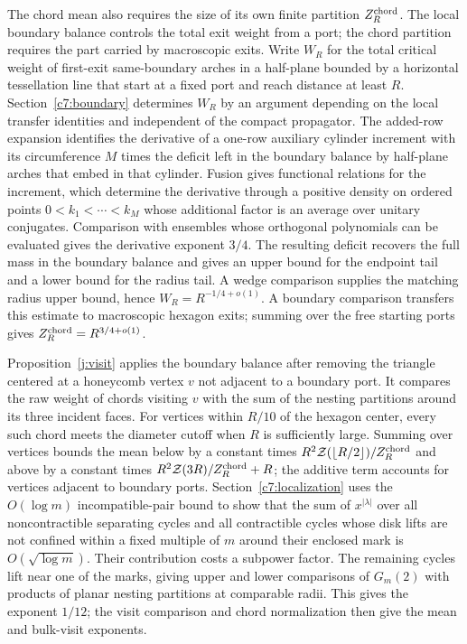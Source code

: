 The chord mean also requires the size of its own finite partition
$Z_R^{\rm chord}$. The local boundary balance controls the total exit
weight from a port; the chord partition requires the part carried by
macroscopic exits. Write $W_R$ for the total critical weight of
first-exit same-boundary arches in a half-plane bounded by a horizontal
tessellation line that start at a fixed port and reach distance at least
$R$. Section~\ref{c7:boundary}
determines $W_R$ by an argument depending on the local transfer
identities and independent of the compact propagator. The added-row
expansion identifies the derivative of a one-row auxiliary cylinder increment
with its circumference $M$ times the deficit left in the boundary
balance by half-plane arches that embed in that cylinder. Fusion gives
functional relations for the increment, which determine the derivative
through a positive density on ordered points $0<k_1<\cdots<k_M$ whose
additional factor is an average over unitary conjugates. Comparison
with ensembles whose orthogonal polynomials can be evaluated gives the
derivative exponent $3/4$. The resulting deficit recovers the full
mass in the boundary balance and gives an upper bound for the endpoint tail
and a lower bound for the radius tail. A wedge comparison supplies the
matching radius upper bound, hence $W_R=R^{-1/4+o(1)}$. A boundary
comparison transfers this estimate to macroscopic hexagon exits;
summing over the free starting ports gives
$Z_R^{\rm chord}=R^{3/4+o(1)}$.

Proposition~\ref{j:visit} applies the boundary balance after removing
the triangle centered at a honeycomb vertex $v$ not adjacent to a
boundary port. It compares the raw weight of chords visiting $v$ with
the sum of the nesting partitions around its three incident
faces. For vertices within $R/10$ of the hexagon center, every such
chord meets the diameter cutoff when $R$ is sufficiently large.
Summing over vertices bounds the mean below by a constant times
$R^2\mathcal Z(\lfloor R/2\rfloor)/Z_R^{\rm chord}$ and above by a
constant times $R^2\mathcal Z(3R)/Z_R^{\rm chord}+R$; the additive term
accounts for vertices adjacent to boundary ports.
Section~\ref{c7:localization} uses the $O(\log m)$ incompatible-pair
bound to show that the sum of $x^{|\lambda|}$ over all noncontractible
separating cycles and all contractible cycles whose disk lifts are not
confined within a fixed multiple of $m$ around their enclosed mark is
$O(\sqrt{\log m})$. Their contribution costs a subpower factor.
The remaining cycles lift near one of the marks, giving upper and
lower comparisons of $G_m(2)$ with products of planar nesting
partitions at comparable radii. This gives
the exponent $1/12$; the visit comparison and chord normalization then
give the mean and bulk-visit exponents.

